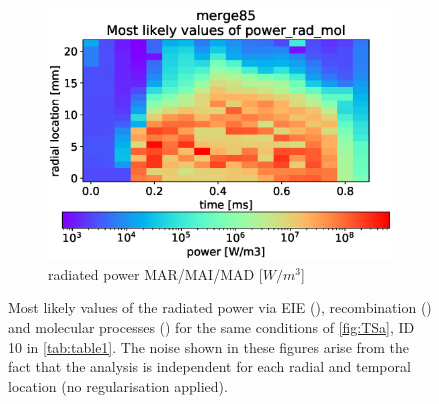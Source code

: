 \begin{figure}[!ht]
\begin{subfigure}{0.48\linewidth}
        \label{fig:bayes_example_1b}
    \end{subfigure}
    \hfill
    \begin{subfigure}{0.48\linewidth}
    	\includegraphics[width=\linewidth,trim={0 30 0 45},clip]{Chapters/chapter3/figs/_merge85_global_fit_example4.eps}
         \caption{radiated power MAR/MAI/MAD [$W/m^3$]}
        \label{fig:bayes_example_1c}
    \end{subfigure}
	\caption{Most likely values of the radiated power via EIE (), recombination () and molecular processes () for the same conditions of \autoref{fig:TSa}, ID 10 in \autoref{tab:table1}. The noise shown in these figures arise from the fact that the analysis is independent for   each radial and temporal location (no regularisation applied).}
    \label{fig:bayes_example_1}
\end{figure}

